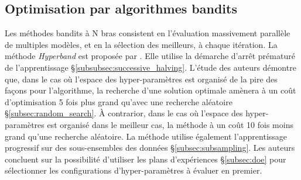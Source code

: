 \subsection{Optimisation par algorithmes bandits} \label{subsec:bandit}
Les méthodes bandits à N bras consistent en l'évaluation massivement parallèle de multiples modèles, et en la sélection des meilleurs, à chaque itération.
La méthode \textit{Hyperband} est proposée par \citeauthor{li_hyperband_2016} \cite{li_hyperband_2016}.
Elle utilise la démarche d'arrêt prématuré de l'apprentissage §\ref{subsubsec:successive_halving}.
L'étude des auteurs démontre que, dans le cas où l'espace des hyper-paramètres est organisé de la pire des façons pour l'algorithme, la recherche d'une solution optimale amènera à un coût d'optimisation 5 fois plus grand qu'avec une recherche aléatoire §\ref{subsec:random_search}.
À contrarior, dans le cas où l'espace des hyper-paramètres est organisé dans le meilleur cas, la méthode à un coût 10 fois moins grand qu'une recherche aléatoire.
La méthode utilise également l'apprentissage progressif sur des sous-ensembles des données §\ref{subsec:subsampling}.
Les auteurs concluent sur la possibilité d'utiliser les plans d'expériences §\ref{subsec:doe} pour sélectionner les configurations d'hyper-paramètres à évaluer en premier.
%
%

